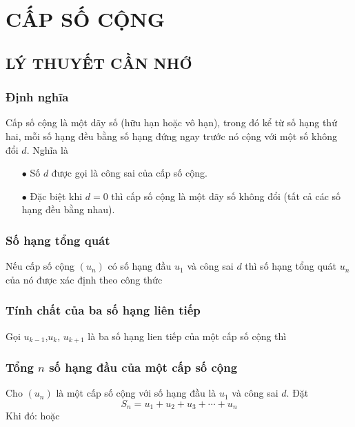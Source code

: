 \section{CẤP SỐ CỘNG}
\subsection{LÝ THUYẾT CẦN NHỚ}
\subsubsection{Định nghĩa}
Cấp số cộng là một dãy số (hữu hạn hoặc vô hạn), trong đó kể từ số hạng thứ hai, mỗi số hạng đều bằng số hạng đứng ngay trước nó cộng với một số không đổi $d.$ Nghĩa là
\begin{gachsoc}
	\begin{itemize}
		\item [$\bullet$] Số $d$ được gọi là công sai của cấp số cộng.
		\item [$\bullet$] Đặc biệt khi $d=0$ thì cấp số cộng là một dãy số không đổi (tất cả các số hạng đều bằng nhau).
	\end{itemize}
\end{gachsoc}
\subsubsection{Số hạng tổng quát}
	Nếu cấp số cộng $\left(u_n\right)$ có số hạng đầu $u_1$ và công sai $d$ thì số hạng tổng quát $u_n$ của nó được xác định theo công thức

\subsubsection{Tính chất của ba số hạng liên tiếp}
Gọi $u_{k-1}$,$u_{k}$, $u_{k+1}$ là ba số hạng lien tiếp của một cấp số cộng thì 

\subsubsection{Tổng $ n $ số hạng đầu của một cấp số cộng}
	Cho $(u_n)$ là một cấp số cộng với số hạng đầu là $u_1$ và công sai $d$. Đặt $${{S}_{n}}={{u}_{1}}+{{u}_{2}}+{{u}_{3}}+\cdots+{{u}_{n}}$$
	Khi đó:
	hoặc 

